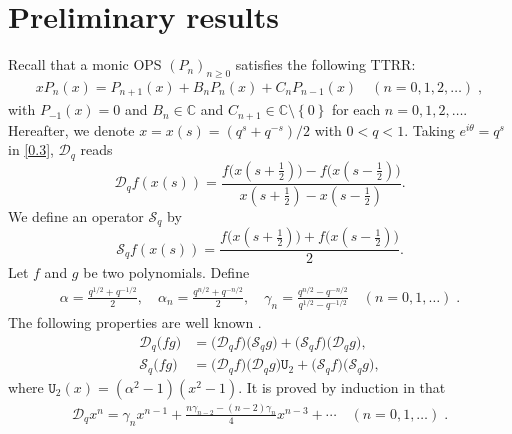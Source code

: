 \documentclass{amsart}
\theoremstyle{remark}
\numberwithin{equation}{section}
\begin{document}
\section{Preliminary results}
Recall that a monic OPS $(P_n)_{n\geq 0}$ satisfies the following TTRR:
\begin{align}
x P_n(x)=P_{n+1}(x)+B_nP_n(x)+C_nP_{n-1}(x) \quad (n=0,1,2,\dots)\;,\label{TTRR}
\end{align}
with $P_{-1}(x)=0$ and $B_n\in \mathbb{C}$ and $C_{n+1} \in \mathbb{C}\setminus \left\lbrace 0\right\rbrace$ for each $n=0,1,2,\ldots$.  Hereafter, we denote $x=x(s)=(q^{s}+q^{-s})/2$ with $0<q<1$. Taking $e^{i\theta}=q^s$ in \eqref{0.3}, $\mathcal{D}_q$ reads
\begin{equation*}%
\mathcal{D}_q f(x(s))= \frac{f\big(x(s+\frac{1}{2})\big)-f\big(x(s-\frac{1}{2})\big)}{x(s+\frac{1}{2})-x(s-\frac{1}{2})}.
\end{equation*}
We define an operator $\mathcal{S}_q$ by
\begin{equation*}%
\mathcal{S}_q f(x(s))=\frac{f\big(x(s+\frac{1}{2})\big)+f\big(x(s-\frac{1}{2})\big)}{2}.
\end{equation*}
Let $f$ and $g$ be two polynomials. Define
\begin{align*}
\alpha= \frac{q^{1/2}+q^{-1/2}}{2},\quad \alpha_n= \frac{q^{n/2}+q^{-n/2}}{2},\quad  \gamma_n=\frac{q^{n/2}-q^{-n/2}}{q^{1/2}-q^{-1/2}} \quad (n=0,1,\dots)\;.
\end{align*} The following properties are well known \cite{KCDMJP2022, IsmailBook2005}.
\begin{align}
\mathcal{D}_q \big(fg\big)&= \big(\mathcal{D}_q f\big)\big(\mathcal{S}_q g\big)+\big(\mathcal{S}_q f\big)\big(\mathcal{D}_q g\big), \label{def-Dx-fg} \\[7pt]
\mathcal{S}_q \big( fg\big)&=\big(\mathcal{D}_q f\big) \big(\mathcal{D}_q g\big)\texttt{U}_2  +\big(\mathcal{S}_q f\big) \big(\mathcal{S}_q g\big), \label{def-Sx-fg}
\end{align}
where $\texttt{U}_2(x)=(\alpha^2 -1)(x^2-1)$.
It is proved by induction in \cite[Proposition 2.1]{KCDMJP2022} that 
\begin{align}
\mathcal{D}_q x^n =\gamma_n x^{n-1}+\frac{n\gamma_{n-2}-(n-2)\gamma_n}{4} x^{n-3}+\cdots \quad (n=0,1,\dots)\;. \label{Dx-xn}
\end{align}
\end{document}
